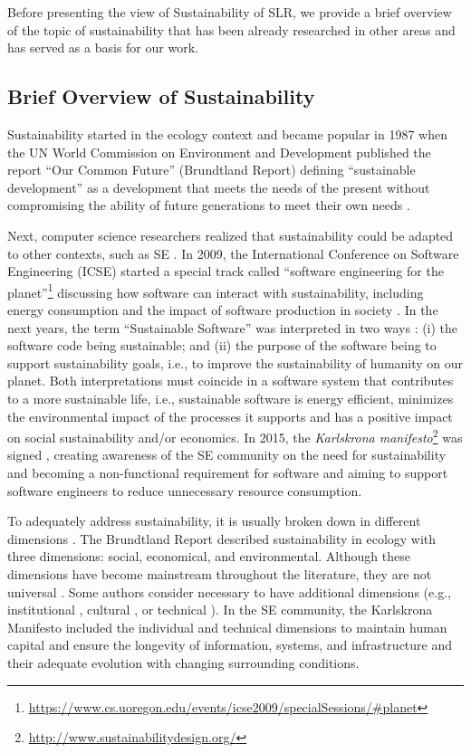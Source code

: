 \documentclass{article}
\begin{document}
Before presenting the view of Sustainability of SLR, we provide a brief overview of the topic of sustainability that has been already researched in other areas and has served as a basis for our work. 

\subsection{Brief Overview of Sustainability}

Sustainability started in the ecology context \cite{Purvis2018three} and became popular in 1987 when the UN World Commission on Environment and Development published the report ``Our Common Future'' (Brundtland Report) defining ``sustainable development'' as a development that meets the needs of the present without compromising the ability of future generations to meet their own needs \cite{keeble1988brundtland}.  

Next, computer science researchers realized that sustainability could be adapted to other contexts, such as SE \cite{Hilty2011Sustainability}. In 2009, the International Conference on Software Engineering (ICSE) started a special track called ``software engineering for the planet''\footnote{\url{https://www.cs.uoregon.edu/events/icse2009/specialSessions/\#planet}} discussing how software can interact with sustainability, including energy consumption and the impact of software production in society \cite{Hilty2011Sustainability}. In the next years, the term ``Sustainable Software'' was interpreted in two ways \cite{Penzenstadler2014Systematic}: (i) the software code being sustainable; and (ii) the purpose of the software being to support sustainability goals, i.e., to improve the sustainability of humanity on our planet. Both interpretations must coincide in a software system that contributes to a more sustainable life, i.e., sustainable software is energy efficient, minimizes the environmental impact of the processes it supports and has a positive impact on social sustainability and/or economics. In 2015, the \textit{Karlskrona manifesto}\footnote{\url{http://www.sustainabilitydesign.org/}} was signed \cite{Becker2015Sustainability}, creating awareness of the SE community on the need for sustainability and becoming a non-functional requirement for software \cite{Raisian2016Current} and aiming to support software engineers to reduce unnecessary resource consumption. 

To adequately address sustainability, it is usually broken down in different dimensions \cite{Purvis2018three}. The Brundtland Report \cite{keeble1988brundtland} described sustainability in ecology with three dimensions: social, economical, and environmental. Although these dimensions have become mainstream throughout the literature, they are not universal \cite{Purvis2018three}. Some authors consider necessary to have additional dimensions (e.g., institutional \cite{Spangenberg2002}, cultural \cite{Soini2014}, or technical \cite{Hill1997}). In the SE community, the Karlskrona Manifesto included the individual and technical dimensions to maintain human capital and ensure the longevity of information, systems, and infrastructure and their adequate evolution with changing surrounding conditions. 
\end{document}
